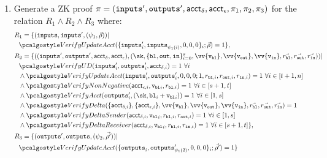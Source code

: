 \begin{enumerate}
    \item Generate a ZK proof $\pi = ({\textup{\texttt{inputs}}}', {\textup{\texttt{outputs}}}', \textup{\textsf{acct}}_{\delta}, \textup{\textsf{acct}}_{\epsilon}, \pi_1, \pi_2, \pi_3)$ for the relation $R_1 \land R_2 \land R_3$ where:
    \begin{align*}
        & R_1 = \{(\inputs, \inputs', (\psi_1, \vec{\rho})) | \\
        & \ \ \verupdacc(\{\inputs'_i, \inputs_{\psi_1(i)},0,0,0\}_i; \vec{\rho}) = 1
        \}, \\
        & R_2 = \{((\inputs', \outputs', \acct_{\delta}, \acct_{\epsilon}), (\sk, \{ \varbl, \varout, \varin \}_{i=0}^s, \vv{\vbl}, \vv{\vout}, \vv{\vin}, \vec{r_\varbl}, \vec{r_\varout}, \vec{r_\varin}))| \\
        & \ \ \verupddelta (\inputs'_i, \outputs'_i, \acct_{\delta,i}) = 1 \ \forall i \\
        & \ \ \land \verupdacc (\inputs'_i, \outputs'_i,0,0,0; 1, r_{\varbl, i}, r_{\varout, i}, r_{\varin, i}) = 1 \ \forall i \in [t+1,n]\\ 
        & \ \ \land \vernonneg (\acct_{\epsilon,i}, {\vbl}_i, r_{\varbl,i}) = 1 \ \forall i \in [s+1,t] \\
        & \ \ \land \veract (\outputs'_i, (\sk, {\varbl}_i + {\vbl}_i)) = 1 \ \forall i \in [1,s] \\
        & \ \ \land \verdelta (\{ \acct_{\delta,i} \}, \{ \acct_{\epsilon,i} \}, \vv{\vbl}, \vv{\vout}, \vv{\vin}, \vec{r_{\varbl}}, \vec{r_{\varout}}, \vec{r_{\varin}}) = 1 \\
        & \ \ \land \versenderdelta(\acct_{\delta,i}, {\vbl}_i, r_{\varbl,i}, r_{\varout,i}) = 1 \ \forall i \in [1,s] \\
        & \ \ \land \verrecdelta(\acct_{\delta,i}, {\vbl}_i, r_{\varbl,i}, r_{\varin,i}) = 1 \ \forall i \in [s+1,t]
        \}, \\
        & R_3 = \{(\outputs', \outputs, (\psi_2, \vec{\rho^\prime})) | \\
        & \ \ \verupdacc(\{\outputs_i, \outputs'_{\psi_1(2)},0,0,0\}_i; \vec{\rho^\prime}) = 1
        \}
    \end{align*}
\end{enumerate}

